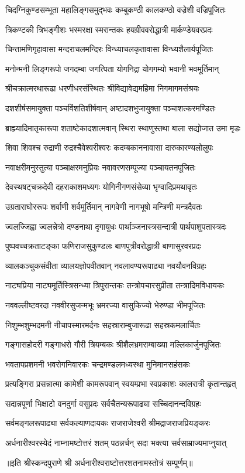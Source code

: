 \twolineshloka
{चिदग्निकुण्डसम्भूता महालिङ्गसमुद्भवः}
{कम्बुकण्ठी कालकण्ठो वज्रेशी वज्रिपूजितः}%

\twolineshloka
{त्रिकण्टकी त्रिभङ्गीशः भस्मरक्षा स्मरान्तकः}
{हयग्रीववरोद्धात्री मार्कण्डेयवरप्रदः}%

\twolineshloka
{चिन्तामणिगृहावासा मन्दराचलमन्दिरः}
{विन्ध्याचलकृतावासा विन्ध्यशैलार्यपूजितः}%

\twolineshloka
{मनोन्मनी लिङ्गरूपो जगदम्बा जगत्पिता}
{योगनिद्रा योगगम्यो भवानी भवमूर्तिमान्}%

\twolineshloka
{श्रीचक्रात्मरथारूढा धरणीधरसंस्थितः}
{श्रीविद्यावेद्यमहिमा निगमागमसंश्रयः}%

\twolineshloka
{दशशीर्षसमायुक्ता पञ्चविंशतिशीर्षवान्}
{अष्टादशभुजायुक्ता पञ्चाशत्करमण्डितः}%

\twolineshloka
{ब्राह्म्यादिमातृकारूपा शताष्टेकादशात्मवान्}
{स्थिरा स्थाणुस्तथा बाला सद्योजात उमा मृडः}%

\twolineshloka
{शिवा शिवश्च रुद्राणी रुद्रश्चैवेश्वरीश्वरः}
{कदम्बकाननावासा दारुकारण्यलोलुपः}%

\twolineshloka
{नवाक्षरीमनुस्तुत्या पञ्चाक्षरमनुप्रियः}
{नवावरणसम्पूज्या पञ्चायतनपूजितः}%

\twolineshloka
{देवस्थषट्चक्रदेवी दहराकाशमध्यगः}
{योगिनीगणसंसेव्या भृग्वादिप्रमथावृतः}%

\twolineshloka
{उग्रताराघोररूपः शर्वाणी शर्वमूर्तिमान्}
{नागवेणी नागभूषो मन्त्रिणी मन्त्रदैवतः}%

\twolineshloka
{ज्वलज्जिह्वा ज्वलन्नेत्रो दण्डनाथा दृगायुधः}
{पार्थाञ्जनास्त्रसन्दात्री पार्थपाशुपतास्त्रदः}%

\twolineshloka
{पुष्पवच्चक्रताटङ्का फणिराजसुकुण्डलः}
{बाणपुत्रीवरोद्धात्री बाणासुरवरप्रदः}%

\twolineshloka
{व्यालकञ्चुकसंवीता व्यालयज्ञोपवीतवान्}
{नवलावण्यरूपाढ्या नवयौवनविग्रहः}%

\twolineshloka
{नाट्यप्रिया नाट्यमूर्तिस्त्रिसन्ध्या त्रिपुरान्तकः}
{तन्त्रोपचारसुप्रीता तन्त्रादिमविधायकः}%

\twolineshloka
{नववल्लीष्टवरदा नववीरसुजन्मभूः}
{भ्रमरज्या वासुकिज्यो भेरुण्डा भीमपूजितः}%

\twolineshloka
{निशुम्भशुम्भदमनी नीचापस्मारमर्दनः}
{सहस्राराम्बुजारूढा सहस्रकमलार्चितः}%

\twolineshloka
{गङ्गासहोदरी गङ्गाधरो गौरी त्रियम्बकः}
{श्रीशैलभ्रमराम्बाख्या मल्लिकार्जुनपूजितः}%

\twolineshloka
{भवतापप्रशमनी भवरोगनिवारकः}
{चन्द्रमण्डलमध्यस्था मुनिमानसहंसकः}%

\twolineshloka
{प्रत्यङ्गिरा प्रसन्नात्मा कामेशी कामरूपवान्}
{स्वयम्प्रभा स्वप्रकाशः कालरात्री कृतान्तहृत्}%

\twolineshloka
{सदान्नपूर्णा भिक्षाटो वनदुर्गा वसुप्रदः}
{सर्वचैतन्यरूपाढ्या सच्चिदानन्दविग्रहः}%

\twolineshloka
{सर्वमङ्गलरूपाढ्या सर्वकल्याणदायकः}
{राजराजेश्वरी श्रीमद्राजराजप्रियङ्करः}%

\twolineshloka
{अर्धनारीश्वरस्येदं नाम्नामष्टोत्तरं शतम्}
{पठन्नर्चन् सदा भक्त्या सर्वसाम्राज्यमाप्नुयात्}%

॥इति श्रीस्कन्दपुराणे श्री अर्धनारीश्वराष्टोत्तरशतनामस्तोत्रं सम्पूर्णम्॥